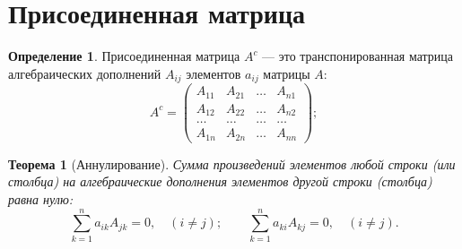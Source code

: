\documentclass[a4paper,12pt]{extbook}
\newtheorem{theorem}{Теорема}[section]
\theoremstyle{definition}
\newtheorem{definition}{Определение}[section]
\begin{document}
\section{Присоединенная матрица}
\label{sec:org9f4f382}
\begin{definition}
    Присоединенная матрица \(A^c\) — это транспонированная матрица алгебраических дополнений \(A_{ij}\) элементов \(a_{ij}\) матрицы \(A\):
    \begin{equation*}
        A^c =
        \begin{pmatrix}
            A_{11} & A_{21} & \ldots & A_{n1} \\
            A_{12} & A_{22} & \ldots & A_{n2} \\
            \ldots & \ldots & \ldots & \ldots \\
            A_{1n} & A_{2n} & \ldots & A_{nn}
        \end{pmatrix};
    \end{equation*}
\end{definition}

\begin{theorem}[Аннулирование]
    Сумма произведений  элементов любой строки (или столбца) на алгебраические дополнения элементов другой строки (столбца) равна нулю:
    \begin{equation*}
        \sum_{k = 1}^n a_{ik} A_{jk} = 0, \quad (i \neq j);
        \qquad
        \sum_{k = 1}^n a_{ki} A_{kj} = 0, \quad (i \neq j).
    \end{equation*}
    \label{det-cancellation}
\end{theorem}
\end{document}
